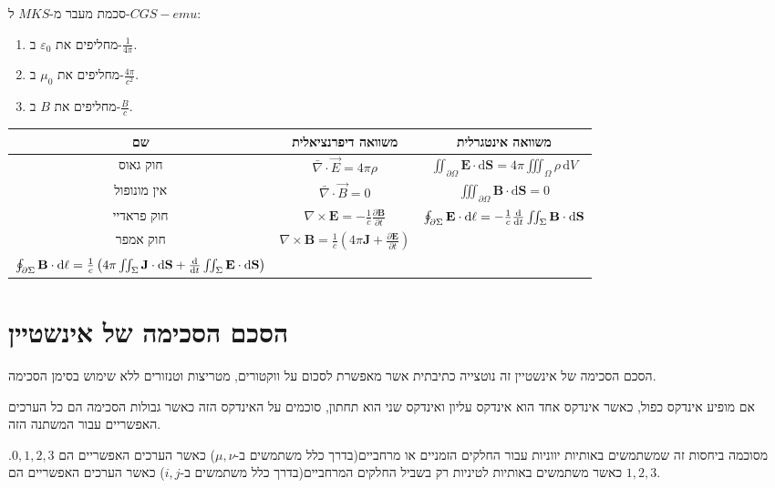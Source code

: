 \documentclass{tstextbook}
\begin{document}
סכמת מעבר מ-\(MKS\) ל-\(CGS-emu\):

\begin{enumerate}
  \item מחליפים את \(\varepsilon_{0}\) ב-\(\frac{1}{4\pi}\). 


  \item מחליפים את \(\mu_{0}\) ב-\(\frac{4\pi}{c^{2}}\). 


  \item מחליפים את \(B\) ב-\(\frac{B}{c}\). 


\end{enumerate}
\begin{table}[htbp]
  \centering
  \begin{tabular}{|ccc|}
    \hline
    שם & משוואה דיפרנציאלית & משוואה אינטגרלית \\ \hline
    חוק גאוס & \(\bar{\nabla} \cdot \vec{E}=4\pi \rho\) & \(\iint_{\partial\Omega}\mathbf{E}\cdot\mathrm{d}\mathbf{S}=4\pi\iiint_{\Omega}\rho\,\mathrm{d}V\) \\ \hline
    אין מונופול & \(\bar{\nabla} \cdot \vec{B}=0\) & \(\iiint_{\partial\Omega}\mathbf{B}\cdot\mathrm{d}\mathbf{S}=0\) \\ \hline
    חוק פראדיי & \(\nabla\times\mathbf{E}=-{\frac{1}{c}}{\frac{\partial\mathbf{B}}{\partial t}}\) & \(\oint_{\partial\Sigma}\mathbf{E}\cdot\mathrm{d}{\bf{\ell}}=-{\frac{1}{c}}{\frac{\mathrm{d}}{\mathrm{d}t}}\iint_{\Sigma}\mathbf{B}\cdot\mathrm{d}\mathbf{S}\) \\ \hline
    חוק אמפר & \(\nabla\times\mathbf{B}={\frac{1}{c}}\left(4\pi\mathbf{J}+{\frac{\partial\mathbf{E}}{\partial t}}\right)\) & \\
\(\oint_{\partial\Sigma}\mathbf{B}\cdot\mathrm{d}{\bf{\ell}}={\frac{1}{c}}\left(4\pi\iint_{\Sigma}\mathbf{J}\cdot\mathrm{d}\mathbf{S}+{\frac{\mathrm{d}}{\mathrm{d}t}}\iint_{\Sigma}\mathbf{E}\cdot\mathrm{d}\mathbf{S}\right)\) \\ \hline
  \end{tabular}
\end{table}
\section{הסכם הסכימה של אינשטיין}

הסכם הסכימה של אינשטיין זה נוטצייה כתיבתית אשר מאפשרת לסכום על ווקטורים, מטריצות וטנזורים ללא שימוש בסימן הסכימה. 

\begin{definition}
אם מופיע אינדקס כפול, כאשר אינדקס אחד הוא אינדקס עליון ואינדקס שני הוא תחתון, סוכמים על האינדקס הזה כאשר גבולות הסכימה הם כל הערכים האפשריים עבור המשתנה הזה.

\end{definition}
מסוכמה ביחסות זה שמשתמשים באותיות יווניות עבור החלקים הזמניים או מרחביים(בדרך כלל משתמשים ב-\(\mu,\nu\)) כאשר הערכים האפשריים הם \(0,1,2,3\).
כאשר משתמשים באותיות לטיניות רק בשביל החלקים המרחביים(בדרך כלל משתמשים ב-\(i,j\)) כאשר הערכים האפשריים הם \(1,2,3\).
\end{document}
